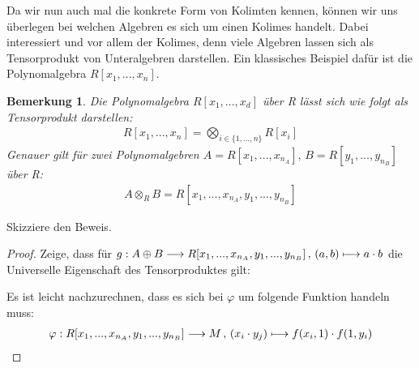 \documentclass[10pt,a4paper]{report}
\newcounter{Aussage}[chapter]
\newtheorem{bem}[Aussage]{Bemerkung}
\newcommand{\function}[5]{\nolinebreak{#1:#2 \longrightarrow #3 \, , \, #4 \longmapsto #5}}
\newcommand{\Tensor}[3]{#1 \otimes_{#2} #3}
\begin{document}
Da wir nun auch mal die konkrete Form von Kolimten kennen, können wir uns überlegen bei welchen Algebren es sich um einen Kolimes handelt. Dabei interessiert und vor allem der Kolimes, denn viele Algebren lassen sich als Tensorprodukt von Unteralgebren darstellen. Ein klassisches Beispiel dafür ist die Polynomalgebra $R[x_1,...,x_n]$.
\begin{bem}\label{Darstellung der Polynomalgebra als Tensorprodukt}
Die Polynomalgebra $R[x_1,...,x_d]$ über R lässt sich wie folgt als Tensorprodukt darstellen:
\begin{gather*}
R[x_1,...,x_n] = \bigotimes_{i \in \lbrace 1,...,n \rbrace} R[x_i]
\end{gather*}
Genauer gilt für zwei Polynomalgebren $A = R[x_1,...,x_{n_A}], \, B = R[y_1,...,y_{n_B}]$ über R:
\begin{gather*}
\Tensor{A}{R}{B}  = R[x_1,...,x_{n_A},y_1,...,y_{n_B}]
\end{gather*}
\end{bem}
Skizziere den Beweis.
\begin{proof}
Zeige, dass für $\function{g}{A \oplus B}{R[x_1,...,x_{n_A},y_1,...,y_{n_B}]}{(a,b)}{a \cdot b}$ die Universelle Eigenschaft des Tensorproduktes gilt:
\begin{center}
\end{center}
Es ist leicht nachzurechnen, dass es sich bei $\varphi$ um folgende Funktion handeln muss:
\begin{gather*}
\function{\varphi}{R[x_1,...,x_{n_A},y_1,...,y_{n_B}]}{M}{(x_i \cdot y_j)}{f(x_i,1) \cdot f(1,y_i)}
\end{gather*}
\end{proof}
\end{document}
